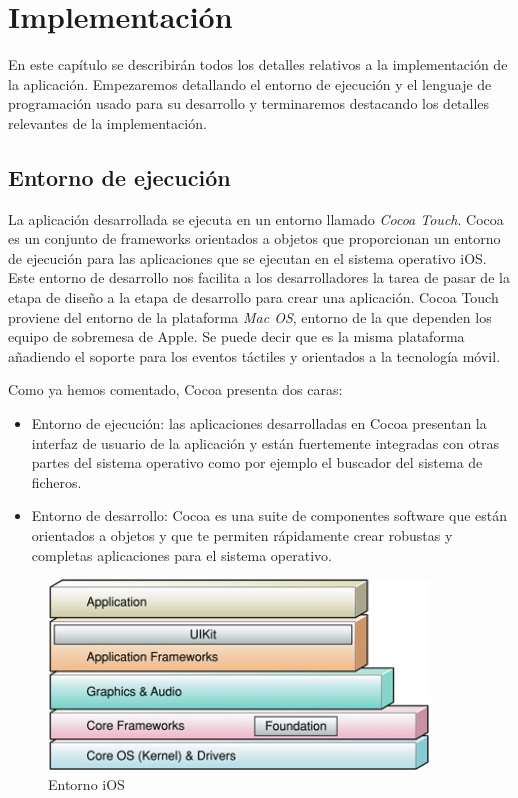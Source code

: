 \chapter{Implementación}
\label{ch:implemetacion}
 En este capítulo se describirán todos los detalles relativos a la implementación de la aplicación. Empezaremos detallando el entorno de ejecución y el lenguaje de programación usado para su desarrollo y terminaremos destacando los detalles relevantes de la implementación.
 
\section{Entorno de ejecución}
 La aplicación desarrollada se ejecuta en un entorno llamado \emph{Cocoa Touch}. Cocoa es un conjunto de frameworks orientados a objetos que proporcionan un entorno de ejecución para las aplicaciones que se ejecutan en el sistema operativo iOS. Este entorno de desarrollo nos facilita a los desarrolladores la tarea de pasar de la etapa de diseño a la etapa de desarrollo para crear una aplicación. Cocoa Touch proviene del entorno de la plataforma \emph{Mac OS}, entorno de la que dependen los equipo de sobremesa de Apple. Se puede decir que es la misma plataforma añadiendo el soporte para los eventos táctiles y orientados a la tecnología móvil. 
 
 Como ya hemos comentado, Cocoa presenta dos caras: 
 \begin{itemize}
	\item Entorno de ejecución: las aplicaciones desarrolladas en Cocoa presentan la interfaz de usuario de la aplicación y están fuertemente integradas con otras partes del sistema operativo como por ejemplo el buscador del sistema de ficheros.
	\item Entorno de desarrollo: Cocoa es una suite de componentes software que están orientados a objetos y que te permiten rápidamente crear robustas y completas aplicaciones para el sistema operativo.
\end{itemize}
  
 \begin{figure}[ht!]
    \centering
       \includegraphics[width=0.9\textwidth]{./images/architecture_stack.jpg}
     \caption{Entorno iOS }
   \label{fig:iOS Platform}
\end{figure}
 
